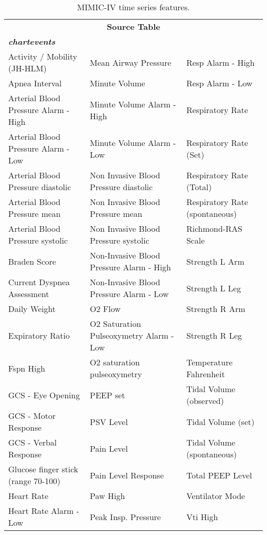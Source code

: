 \documentclass[sigconf]{acmart}
\begin{document}
\begin{table*}[h]
    \caption{MIMIC-IV time series features.}
    \label{tab:timeseriesMIMIC}
    \centering
    \begin{tabular}{lll}
        \toprule
        \multicolumn{3}{c}{\textbf{Source Table}} \\
        \multicolumn{3}{l}{\textbf{\textit{chartevents}}} \\
        \midrule
        Activity / Mobility (JH-HLM) & Mean Airway Pressure & Resp Alarm - High \\
        Apnea Interval & Minute Volume & Resp Alarm - Low \\
        Arterial Blood Pressure Alarm - High & Minute Volume Alarm - High & Respiratory Rate \\
        Arterial Blood Pressure Alarm - Low & Minute Volume Alarm - Low & Respiratory Rate (Set) \\
        Arterial Blood Pressure diastolic & Non Invasive Blood Pressure diastolic & Respiratory Rate (Total) \\
        Arterial Blood Pressure mean & Non Invasive Blood Pressure mean & Respiratory Rate (spontaneous) \\
        Arterial Blood Pressure systolic & Non Invasive Blood Pressure systolic & Richmond-RAS Scale \\
        Braden Score & Non-Invasive Blood Pressure Alarm - High & Strength L Arm \\
        Current Dyspnea Assessment & Non-Invasive Blood Pressure Alarm - Low & Strength L Leg \\
        Daily Weight & O2 Flow & Strength R Arm \\
        Expiratory Ratio & O2 Saturation Pulseoxymetry Alarm - Low & Strength R Leg \\
        Fspn High & O2 saturation pulseoxymetry & Temperature Fahrenheit \\
        GCS - Eye Opening & PEEP set & Tidal Volume (observed) \\
        GCS - Motor Response & PSV Level & Tidal Volume (set) \\
        GCS - Verbal Response & Pain Level & Tidal Volume (spontaneous) \\
        Glucose finger stick (range 70-100) & Pain Level Response & Total PEEP Level \\
        Heart Rate & Paw High & Ventilator Mode \\
        Heart Rate Alarm - Low & Peak Insp. Pressure & Vti High \\

\end{tabular}
\end{table*}
\end{document}

